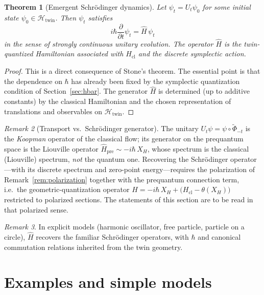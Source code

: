 \documentclass[11pt]{article}
\numberwithin{equation}{section}
\newtheorem{theorem}{Theorem}[section]
\theoremstyle{definition}
\theoremstyle{remark}
\newtheorem{remark}[theorem]{Remark}
\newcommand{\Htw}{\mathcal{H}_{\mathrm{twin}}}
\begin{document}
	\begin{theorem}[Emergent Schr\"odinger dynamics]
		Let $\psi_t = U_t\psi_0$ for some initial state $\psi_0\in\Htw$. Then
		$\psi_t$ satisfies
		\[
		i\hbar \frac{\partial}{\partial t} \psi_t = \widehat{H}\,\psi_t
		\]
		in the sense of strongly continuous unitary evolution. The operator
		$\widehat{H}$ is the twin-quantized Hamiltonian associated with
		$H_{\mathrm{cl}}$ and the discrete symplectic action.
	\end{theorem}
	
	\begin{proof}
		This is a direct consequence of Stone's theorem. The essential point is
		that the dependence on $\hbar$ has already been fixed by the symplectic
		quantization condition of Section~\ref{sec:hbar}. The generator
		$\widehat{H}$ is determined (up to additive constants) by the classical
		Hamiltonian and the chosen representation of translations and observables
		on $\Htw$.
	\end{proof}

	\begin{remark}[Transport vs.\ Schr\"odinger generator]\label{rem:koopman}
		The unitary $U_t\psi=\psi\circ\tilde\Phi_{-t}$ is the \emph{Koopman}
		operator of the classical flow; its generator on the prequantum space
		is the Liouville operator $\widehat{H}_{\mathrm{pre}}\sim -i\hbar\,X_H$,
		whose spectrum is the classical (Liouville) spectrum, \emph{not} the
		quantum one. Recovering the Schr\"odinger operator---with its discrete
		spectrum and zero-point energy---requires the polarization of
		Remark~\ref{rem:polarization} together with the prequantum connection
		term, i.e.\ the geometric-quantization operator
		$\widehat{H}=-i\hbar\,X_H+\big(H_{\mathrm{cl}}-\theta(X_H)\big)$
		restricted to polarized sections. The statements of this section are
		to be read in that polarized sense.
	\end{remark}
	
	\begin{remark}
		In explicit models (harmonic oscillator, free particle, particle on a
		circle), $\widehat{H}$ recovers the familiar Schr\"odinger operators,
		with $\hbar$ and canonical commutation relations inherited from the twin
		geometry.
	\end{remark}
	
	
	\section{Examples and simple models}
	\label{sec:examples}
	
\end{document}
